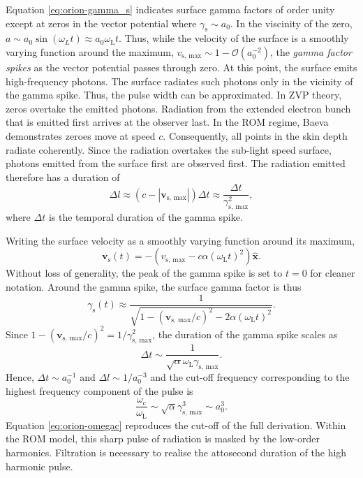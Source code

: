 Equation \ref{eq:orion-gamma_s} indicates surface gamma factors of order unity except at zeros in the vector potential where $\gamma_\mathrm{s} \sim a_0$. In the viscinity of the zero, $a \sim a_0\sin(\omega_L t) \approx a_0\omega_\mathrm{L}t$. Thus, while the velocity of the surface is a smoothly varying function around the maximum, $v_\mathrm{s,\, max} \sim 1 - \mathcal{O}(a_0^{-2})$, the \textit{gamma factor spikes} as the vector potential passes through zero. At this point, the surface emits high-frequency photons. The surface radiates such photons only in the vicinity of the gamma spike. Thus, the pulse width can be approximated. In ZVP theory, zeros overtake the emitted photons. Radiation from the extended electron bunch that is emitted first arrives at the observer last. In the ROM regime, Baeva demonstrates zeroes move at speed $c$. Consequently, all points in the skin depth radiate coherently. Since the radiation overtakes the sub-light speed surface, photons emitted from the surface first are observed first. The radiation emitted therefore has a duration of
\begin{equation}
	\Delta l \approx (c-|\mathbf{v}_\mathrm{s,\, max}|)\Delta t \approx \frac{\Delta t}{\gamma_\mathrm{s,\, max}^2},
\end{equation}
where $\Delta t$ is the temporal duration of the gamma spike. 

Writing the surface velocity as a smoothly varying function around its maximum,
\begin{equation}\label{eq:orion-vs}
	\mathbf{v}_\mathrm{s}(t) = -(v_\mathrm{s,\, max} - c\alpha(\omega_\mathrm{L}t)^2) \mathbf{\hat{x}}.
\end{equation}
Without loss of generality, the peak of the gamma spike is set to $t=0$ for cleaner notation. Around the gamma spike, the surface gamma factor is thus
\begin{equation}
	\gamma_\mathrm{s}(t) \approx \frac{1}{\sqrt{1-(\mathbf{v}_\mathrm{s,\, max}/c)^2 - 2\alpha(\omega_\mathrm{L}t)^2}}.
\end{equation}
Since $1-(\mathbf{v}_\mathrm{s,\, max}/c)^2 = 1/\gamma_\mathrm{s,\, max}^2$, the duration of the gamma spike scales as
\begin{equation}
	\Delta t \sim \frac{1}{\sqrt{\alpha }\omega_\mathrm{L} \gamma_\mathrm{s,\, max}}.
\end{equation}
Hence, $\Delta t \sim a_0^{-1}$ and $\Delta l \sim 1/a_0^{-3}$ and the cut-off frequency corresponding to the highest frequency component of the pulse is
\begin{equation}\label{eq:orion-omegac}
	\frac{\omega_\mathrm{c}}{\omega_\mathrm{L}} \sim \sqrt{\alpha}\gamma_\mathrm{s,\, max}^3 \sim a_0^3.
\end{equation}
Equation \ref{eq:orion-omegac} reproduces the cut-off of the full derivation. Within the ROM model, this sharp pulse of radiation is masked by the low-order harmonics. Filtration is necessary to realise the attosecond duration of the high harmonic pulse.

